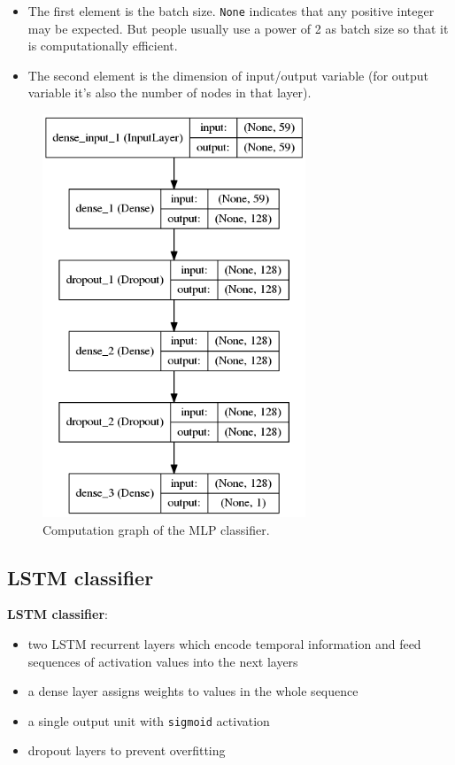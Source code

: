 \documentclass[11pt,a4paper]{report}
\begin{document}
\begin{itemize}
  \item The first element is the batch size.
    \texttt{None} indicates that any positive integer may be expected.
    But people usually use a power of 2 as batch size so that it is computationally efficient.
  \item The second element is the dimension of input/output variable (for output variable it's also the number of nodes in that layer).
\end{itemize}

\begin{figure}[htbp]
  \centering
  \includegraphics[width=0.7\textwidth]{model-mlp.png}
  \caption{Computation graph of the MLP classifier.} \label{fig:mlp}
\end{figure}

\newpage

\subsection{LSTM classifier}

\begin{mdframed}
\noindent \textbf{LSTM classifier}:
\begin{itemize}
  \item two LSTM recurrent layers which encode temporal information and feed sequences of activation values into the next layers
  \item a dense layer assigns weights to values in the whole sequence
  \item a single output unit with \texttt{sigmoid} activation
  \item dropout \parencite{srivastava2014dropout} layers to prevent overfitting
\end{itemize}
\end{mdframed}
\end{document}
